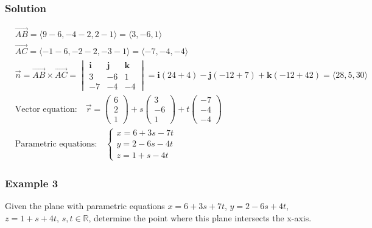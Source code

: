 \documentclass{article}
\begin{document}
\subsubsection*{Solution}
\begin{align*}
    &\overrightarrow{AB} = \langle 9-6, -4-2, 2-1 \rangle = \langle 3, -6, 1 \rangle \\
    &\overrightarrow{AC} = \langle -1-6, -2-2, -3-1 \rangle = \langle -7, -4, -4 \rangle \\
    &\vec{n} = \overrightarrow{AB} \times \overrightarrow{AC} = \begin{vmatrix}
        \mathbf{i} & \mathbf{j} & \mathbf{k} \\
        3 & -6 & 1 \\
        -7 & -4 & -4
    \end{vmatrix} = \mathbf{i}(24 + 4) - \mathbf{j}(-12 + 7) + \mathbf{k}(-12 + 42) = \langle 28, 5, 30 \rangle \\
    &\text{Vector equation:} \quad \vec{r} = \begin{pmatrix} 6 \\ 2 \\ 1 \end{pmatrix} + s \begin{pmatrix} 3 \\ -6 \\ 1 \end{pmatrix} + t \begin{pmatrix} -7 \\ -4 \\ -4 \end{pmatrix} \\
    &\text{Parametric equations:} \quad \begin{cases}
    x = 6 + 3s - 7t \\
    y = 2 - 6s - 4t \\
    z = 1 + s - 4t
    \end{cases}
\end{align*}

\subsubsection*{Example 3}
Given the plane with parametric equations \(x=6+3s+7t\), \(y=2-6s+4t\), \(z=1+s+4t\), \(s, t \in \mathbb{R}\), determine the point where this plane intersects the x-axis.
\end{document}
